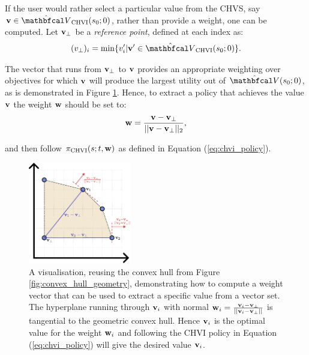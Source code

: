         If the user would rather select a particular value from the CHVS, say $\bff{v}\in\Vchvi(s_0;0)$, rather than provide a weight, one can be computed. Let $\mathbf{v}_\bot$ be a \textit{reference point}, defined at each index as:
        \begin{align}
            (v_{\bot})_i = \min \{v'_i | \bff{v}'\in\Vchvi(s_0;0) \}. \label{eq:chvi_ref_point}
        \end{align} 

        The vector that runs from $\mathbf{v}_\bot$ to $\mathbf{v}$ provides an appropriate weighting over objectives for which $\mathbf{v}$ will produce the largest utility out of $\hat{\bfcl{V}}(s_0;0)$, as is demonstrated in Figure \ref{fig:convex_hull_extract_policy_weight}. Hence, to extract a policy that achieves the value $\mathbf{v}$ the weight $\mathbf{w}$ should be set to:
        \begin{align}
            \mathbf{w} = \frac{\mathbf{v}-\mathbf{v}_\bot}{||\mathbf{v}-\mathbf{v}_\bot||_2}, \label{eq:chvi_extract_value_weight}
        \end{align}

        and then follow ${\pi_{{\textnormal{CHVI}}}}(s;t,\mathbf{w})$ as defined in Equation (\ref{eq:chvi_policy}).
        
        \begin{figure}
            \centering\includegraphics[width=0.4\textwidth]{figures/ch2/ch_extract_policy_weight.pdf} 
            \caption{A visualisation, reusing the convex hull from Figure \ref{fig:convex_hull_geometry}, demonstrating how to compute a weight vector that can be used to extract a specific value from a vector set. The hyperplane running through $\mathbf{v}_i$ with normal $\mathbf{w}_i=\frac{\mathbf{v}_i-\mathbf{v}_\bot}{||\mathbf{v}_i-\mathbf{v}_\bot||}$ is tangential to the geometric convex hull. Hence $\mathbf{v}_i$ is the optimal value for the weight $\mathbf{w}_i$ and following the CHVI policy in Equation (\ref{eq:chvi_policy}) will give the desired value $\mathbf{v}_i$. }
            \label{fig:convex_hull_extract_policy_weight} 
        \end{figure}











